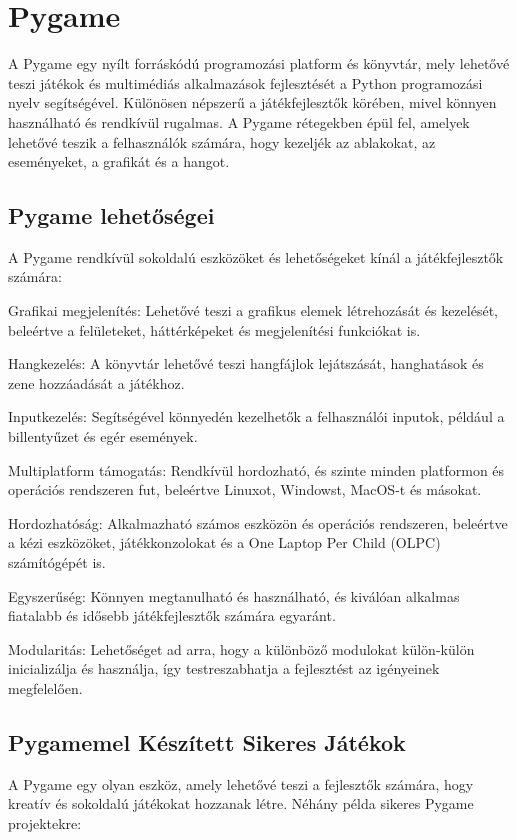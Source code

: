\section{Pygame}
\indent \indent A Pygame egy nyílt forráskódú programozási platform és könyvtár, mely lehetővé teszi játékok és multimédiás alkalmazások fejlesztését a Python programozási nyelv segítségével. Különösen népszerű a játékfejlesztők körében, mivel könnyen használható és rendkívül rugalmas. A Pygame rétegekben épül fel, amelyek lehetővé teszik a felhasználók számára, hogy kezeljék az ablakokat, az eseményeket, a grafikát és a hangot.\cite{pygame}
\subsection{Pygame lehetőségei}
\indent \indent A Pygame rendkívül sokoldalú eszközöket és lehetőségeket kínál a játékfejlesztők számára:

Grafikai megjelenítés: Lehetővé teszi a grafikus elemek létrehozását és kezelését, beleértve a felületeket, háttérképeket és megjelenítési funkciókat is.

Hangkezelés: A könyvtár lehetővé teszi hangfájlok lejátszását, hanghatások és zene hozzáadását a játékhoz.

Inputkezelés: Segítségével könnyedén kezelhetők a felhasználói inputok, például a billentyűzet és egér események.

Multiplatform támogatás: Rendkívül hordozható, és szinte minden platformon és operációs rendszeren fut, beleértve Linuxot, Windowst, MacOS-t és másokat.

Hordozhatóság: Alkalmazható számos eszközön és operációs rendszeren, beleértve a kézi eszközöket, játékkonzolokat és a One Laptop Per Child (OLPC) számítógépét is.

Egyszerűség: Könnyen megtanulható és használható, és kiválóan alkalmas fiatalabb és idősebb játékfejlesztők számára egyaránt.

Modularitás: Lehetőséget ad arra, hogy a különböző modulokat külön-külön inicializálja és használja, így testreszabhatja a fejlesztést az igényeinek megfelelően.



\subsection{Pygamemel Készített Sikeres Játékok}
\indent \indent A Pygame egy olyan eszköz, amely lehetővé teszi a fejlesztők számára, hogy kreatív és sokoldalú játékokat hozzanak létre. Néhány példa sikeres Pygame projektekre:

